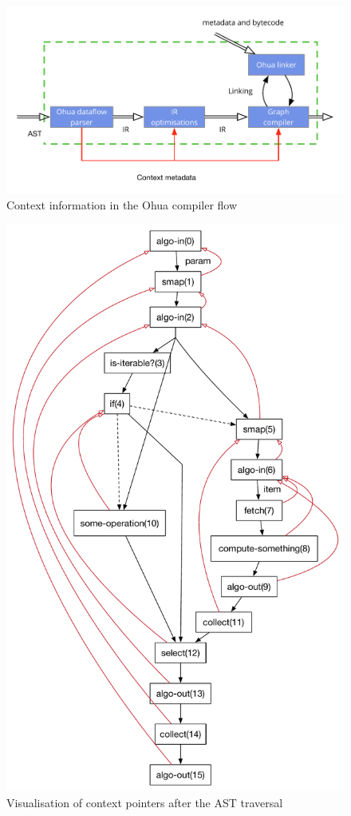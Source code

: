 \begin{figure}
  \includegraphics[width=\linewidth]{../Figures/ohua-compiler-flow-with-ctx}
  \caption{Context information in the Ohua compiler flow}
  \label{fig:ohua-compiler-flow-with-ctx}
\end{figure}

\begin{figure}
  \includegraphics[width=\textwidth]{../Figures/context-pointers}
  \caption{Visualisation of context pointers after the AST traversal}
  \label{fig:context-pointers}
\end{figure}

